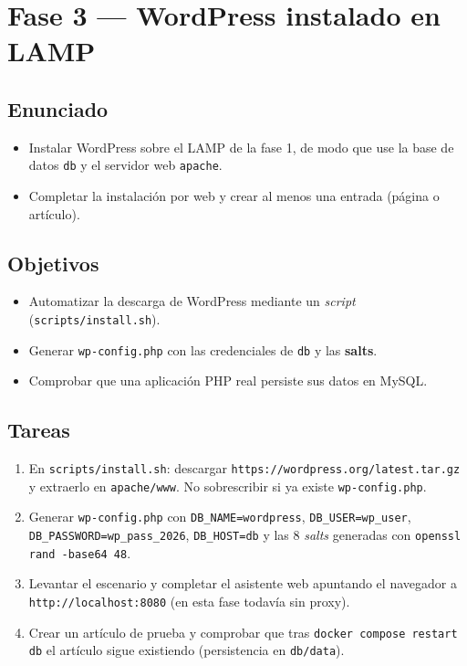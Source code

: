\documentclass[11pt]{article}
\begin{document}
\section{Fase 3 — WordPress instalado en LAMP}
\label{sec:org0000045}

\subsection{Enunciado}
\label{sec:org0000036}
\begin{itemize}
\item Instalar WordPress sobre el LAMP de la fase 1, de modo que use la base de datos
\texttt{db} y el servidor web \texttt{apache}.
\item Completar la instalación por web y crear al menos una entrada (página o artículo).
\end{itemize}
\subsection{Objetivos}
\label{sec:org0000039}
\begin{itemize}
\item Automatizar la descarga de WordPress mediante un \emph{script} (\texttt{scripts/install.sh}).
\item Generar \texttt{wp-config.php} con las credenciales de \texttt{db} y las \textbf{salts}.
\item Comprobar que una aplicación PHP real persiste sus datos en MySQL.
\end{itemize}
\subsection{Tareas}
\label{sec:org000003c}
\begin{enumerate}
\item En \texttt{scripts/install.sh}: descargar \texttt{https://wordpress.org/latest.tar.gz} y
extraerlo en \texttt{apache/www}. No sobrescribir si ya existe \texttt{wp-config.php}.
\item Generar \texttt{wp-config.php} con \texttt{DB\_NAME=wordpress}, \texttt{DB\_USER=wp\_user},
\texttt{DB\_PASSWORD=wp\_pass\_2026}, \texttt{DB\_HOST=db} y las 8 \emph{salts} generadas con
\texttt{openssl rand -base64 48}.
\item Levantar el escenario y completar el asistente web apuntando el navegador a
\texttt{http://localhost:8080} (en esta fase todavía sin proxy).
\item Crear un artículo de prueba y comprobar que tras
\texttt{docker compose restart db} el artículo sigue existiendo (persistencia en
\texttt{db/data}).
\end{enumerate}
\end{document}
